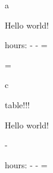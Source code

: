 \documentclass{article}
\begin{document}
  a
  \begin{texvoiceListing}[1]
   Hello world!
   \begin{hours}
    hours: \description - \duration - \wage = \total
   \end{hours}
   \begin{expenses}
    \description \price = \total
   \end{expenses}
   \total
  \end{texvoiceListing}
  c
  \total
  
  \begin{texvoicePage}
   table!!!\\
   \begin{texvoiceListing}[2]
    Hello world!
    \begin{travel}
     \from - \to
    \end{travel}
    \begin{hours}
     hours: \description - \duration - \wage = \total
    \end{hours}
   \end{texvoiceListing}
  \end{texvoicePage}
\end{document}
